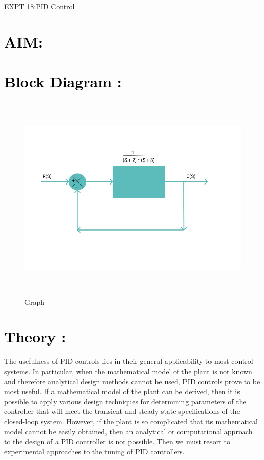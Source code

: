 \documentclass[12pt]{article}
\begin{document}
\begin{center}
    \LARGE {EXPT 18:PID Control}
             
\end{center}

\section*{\textcolor{black}{AIM: }}

\section*{\textcolor{black}{Block Diagram :}}

\begin{figure}[!hth]
        \centering
        \includegraphics[width =20cm, height = 10cm]{images/pid block.jpeg}
        \caption{Graph}
        \label{Graph}
\end{figure}

\section*{\textcolor{black}{Theory :}}
The usefulness of PID controls lies in their general applicability to most control systems. In particular, when the mathematical model of the plant is not known and therefore analytical design methods cannot be used, PID controls prove to be most useful. If a mathematical model of the plant can be derived, then it is possible to apply various design techniques for determining parameters of the controller that will meet the transient and steady-state specifications of the closed-loop system. However, if the plant is so complicated that its mathematical model cannot be easily obtained, then an analytical or computational approach to the design of a PID controller is not possible. Then we must resort to experimental approaches to the tuning of PID controllers.
\end{document}
